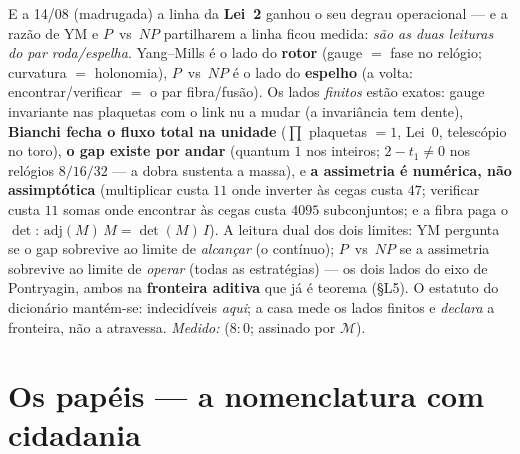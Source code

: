 \documentclass[livro.tex]{subfiles}
\begin{document}
\medskip
\noindent E a 14/08 (madrugada) a linha da \textbf{Lei~2} ganhou o seu
degrau operacional --- e a razão de YM e $P$~vs~$NP$ partilharem a
linha ficou medida: \emph{são as duas leituras do par roda/espelha}.
Yang--Mills é o lado do \textbf{rotor} (gauge $=$ fase no relógio;
curvatura $=$ holonomia), $P$~vs~$NP$ é o lado do \textbf{espelho} (a
volta: encontrar/verificar $=$ o par fibra/fusão). Os lados
\emph{finitos} estão exatos: gauge invariante nas plaquetas com o
link nu a mudar (a invariância tem dente), \textbf{Bianchi fecha o
fluxo total na unidade} ($\prod$ plaquetas $=1$, Lei~0, telescópio no
toro), \textbf{o gap existe por andar} (quantum $1$ nos inteiros;
$2-t_{1}\ne0$ nos relógios $8/16/32$ --- a dobra sustenta a massa), e
\textbf{a assimetria é numérica, não assimptótica} (multiplicar custa
$11$ onde inverter às cegas custa $47$; verificar custa $11$ somas
onde encontrar às cegas custa $4095$ subconjuntos; e a fibra paga o
$\det$: $\mathrm{adj}(M)\,M=\det(M)\,I$). A leitura dual dos dois
limites: YM pergunta se o gap sobrevive ao limite de
\emph{alcançar} (o contínuo); $P$~vs~$NP$ se a assimetria sobrevive ao
limite de \emph{operar} (todas as estratégias) --- os dois lados do
eixo de Pontryagin, ambos na \textbf{fronteira aditiva} que já é
teorema (\S L5). O estatuto do dicionário mantém-se: indecidíveis
\emph{aqui}; a casa mede os lados finitos e \emph{declara} a
fronteira, não a atravessa.
\emph{Medido:}  ($8{:}0$; assinado por
$\mathcal{M}$).

\section{Os papéis --- a nomenclatura com cidadania}\label{sec:papeis}
\end{document}
